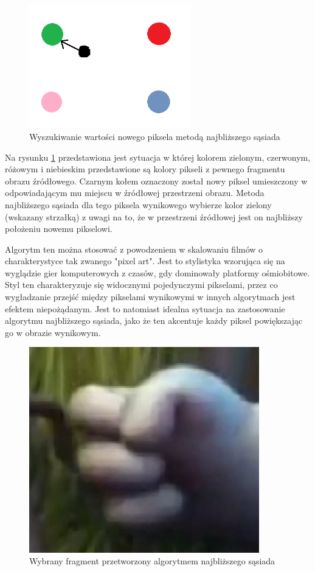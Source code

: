 \documentclass[twoside]{projektInzynierskiMS}
\begin{document}
\begin{figure}[h]
\centering
\includegraphics[width=7cm]{NN.png}
\caption{Wyszukiwanie wartości nowego piksela metodą najbliższego sąsiada}
\label{fig:NNalgo}
\end{figure}

Na rysunku \ref{fig:NNalgo} przedstawiona jest sytuacja w której kolorem zielonym, czerwonym, różowym i niebieskim przedstawione są kolory pikseli z pewnego fragmentu obrazu źródłowego. Czarnym kołem oznaczony został nowy piksel umieszczony w odpowiadającym mu miejscu w źródłowej przestrzeni obrazu. Metoda najbliższego sąsiada dla tego piksela wynikowego wybierze kolor zielony (wskazany strzałką) z uwagi na to, że w przestrzeni źródłowej jest on najbliższy położeniu nowemu pikselowi.

Algorytm ten można stosować z powodzeniem w skalowaniu filmów o charakterystyce tak zwanego "pixel art". Jest to stylistyka wzorująca się na wyglądzie gier komputerowych z czasów, gdy dominowały platformy ośmiobitowe. Styl ten charakteryzuje się widocznymi pojedynczymi pikselami, przez co wygładzanie przejść między pikselami wynikowymi w innych algorytmach jest efektem niepożądanym. Jest to natomiast idealna sytuacja na zastosowanie algorytmu najbliższego sąsiada, jako że ten akcentuje każdy piksel powiększając go w obrazie wynikowym.

\begin{figure}[h]
\centering
\includegraphics[width=10cm]{HandNN.png}
\caption{Wybrany fragment przetworzony algorytmem najbliższego sąsiada}
\label{fig:handNN}
\end{figure}
\end{document}
